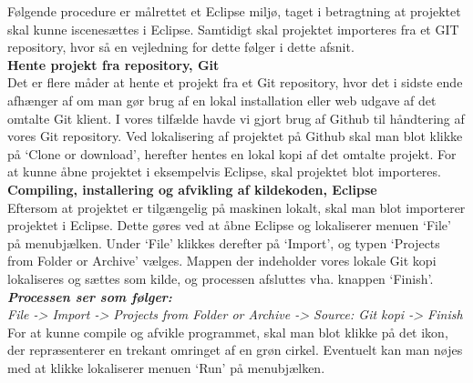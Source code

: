 Følgende procedure er målrettet et Eclipse miljø, taget i betragtning at projektet skal kunne iscenesættes i Eclipse. Samtidigt skal projektet importeres fra et GIT repository, hvor så en vejledning for dette følger i dette afsnit.\\

\noindent \textbf{Hente projekt fra repository, Git}\\
Det er flere måder at hente et projekt fra et Git repository, hvor det i sidste ende afhænger af om man gør brug af en lokal installation eller web udgave af det omtalte Git klient. I vores tilfælde havde vi gjort brug af Github til håndtering af vores Git repository. Ved lokalisering af projektet på Github skal man blot klikke på ‘Clone or download’, herefter hentes en lokal kopi af det omtalte projekt. For at kunne åbne projektet i eksempelvis Eclipse, skal projektet blot importeres.\\

\noindent \textbf{Compiling, installering og afvikling af kildekoden, Eclipse}\\
Eftersom at projektet er tilgængelig på maskinen lokalt, skal man blot importerer projektet i Eclipse. Dette gøres ved at åbne Eclipse og lokaliserer menuen ‘File’ på menubjælken. Under ‘File’ klikkes derefter på ‘Import’, og typen ‘Projects from Folder or Archive’ vælges. Mappen der indeholder vores lokale Git kopi lokaliseres og sættes som kilde, og processen afsluttes vha. knappen ‘Finish’.\\

\noindent \textbf{\textit{Processen ser som følger:}}\\
\textit{File -> Import -> Projects from Folder or Archive -> Source: Git kopi -> Finish}\\

\noindent For at kunne compile og afvikle programmet, skal man blot klikke på det ikon, der repræsenterer en trekant omringet af en grøn cirkel. Eventuelt kan man nøjes med at klikke lokaliserer menuen ‘Run’ på menubjælken.
